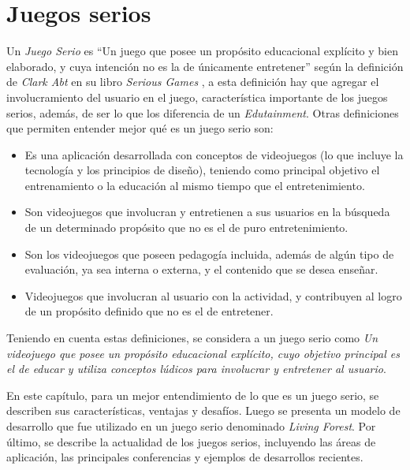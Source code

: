 \chapter{Juegos serios}
\label{chap:juegos_serios}

Un \emph{Juego Serio} es \enquote{Un juego que posee un propósito educacional
    explícito y bien elaborado, y cuya intención no es la de únicamente
    entretener} según la definición de \emph{Clark Abt} en su libro
\emph{Serious Games} \cite{abt1987serious}, a esta definición hay que agregar el
involucramiento del usuario en el juego, característica importante de los juegos
serios, además, de ser lo que los diferencia de un
\emph{Edutainment}\cite{resnick:2004,charsky:2010}. Otras definiciones que
permiten entender mejor qué es un juego serio son:

\begin{itemize}
    \item Es una aplicación desarrollada con conceptos de videojuegos (lo que
        incluye la tecnología y los principios de diseño), teniendo como
        principal objetivo el entrenamiento o la educación al mismo tiempo que
        el entretenimiento\cite{ludus:sg}.
    \item Son videojuegos que involucran y entretienen a sus usuarios en la
        búsqueda de un determinado propósito que no es el de puro
        entretenimiento\cite{ludus:sg}.
    \item Son los videojuegos que poseen pedagogía incluida, además de algún tipo de
        evaluación, ya sea interna o externa, y el contenido que se desea
        enseñar\cite{damien:sg,sg:aoverview}.
        
    \item Videojuegos que involucran al usuario con la actividad, y contribuyen al logro de un propósito definido que no es el de entretener\cite{sg:aoverview}.
\end{itemize}

Teniendo en cuenta estas definiciones, se considera a un juego serio como
\emph{Un videojuego que posee un propósito educacional explícito, cuyo objetivo
    principal es el de educar y utiliza conceptos lúdicos para involucrar y
    entretener al usuario}. 

En este capítulo, para un mejor entendimiento de lo que es un juego serio, se
describen sus características, ventajas y desafíos. Luego se presenta un modelo
de desarrollo que fue utilizado en un juego serio denominado \textit{Living
    Forest}. Por último, se describe la actualidad de los juegos serios,
incluyendo las áreas de aplicación, las principales conferencias y ejemplos de
desarrollos recientes. 








